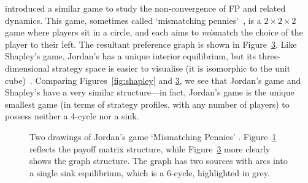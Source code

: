 \documentclass[preprint,authoryear]{elsarticle}
\begin{document}
\cite{jordan_three_1993} introduced a similar game to study the non-convergence of FP and related dynamics. This game, sometimes called `mismatching pennies'~\citep{sandholm2010population,kleinberg_beyond_2011}, is a $2\times 2\times 2$ game where players sit in a circle, and each aims to \emph{mis}match the choice of the player to their left. The resultant preference graph is shown in Figure~\ref{fig:jordan}. Like Shapley's game, Jordan's has a unique interior equilibrium, but its three-dimensional strategy space is easier to visualise (it is isomorphic to the unit cube)~\citep[see][Figure 9.6]{sandholm2010population}. Comparing Figures~\ref{fig:shapley} and \ref{fig:jordan}, we see that Jordan's game and Shapley's have a very similar structure---in fact, Jordan's game is the unique smallest game (in terms of strategy profiles, with any number of players) to possess neither a 4-cycle nor a sink.

\begin{figure}
    \centering
    \begin{subfigure}{.4\textwidth}
        \centering
        
        \caption{}
        \label{fig:jordan-square}
    \end{subfigure}
    \quad
    \begin{subfigure}{.4\textwidth}
        \centering
        
        \caption{}
        \label{fig:jordan-cycle}
    \end{subfigure}
    \caption{Two drawings of Jordan's game `Mismatching Pennies' \citep{jordan_three_1993}. Figure~\ref{fig:jordan-square} reflects the payoff matrix structure, while Figure~\ref{fig:jordan} more clearly shows the graph structure. The graph has two sources with arcs into a single sink equilibrium, which is a 6-cycle, highlighted in grey.}
    \label{fig:jordan}
\end{figure}
\end{document}

